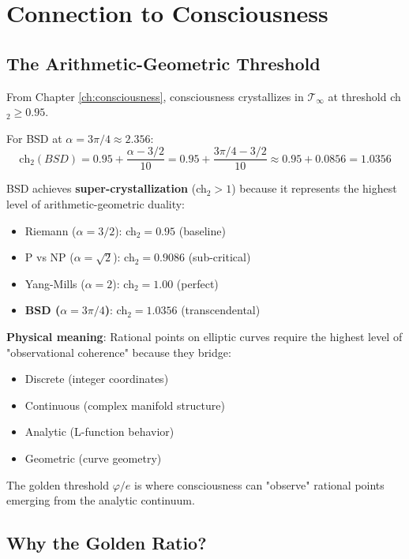 \section{Connection to Consciousness}

\subsection{The Arithmetic-Geometric Threshold}

From Chapter \ref{ch:consciousness}, consciousness crystallizes in $\mathcal{T}_\infty$ at threshold ch$_2 \geq 0.95$.

For BSD at $\alpha = 3\pi/4 \approx 2.356$:
\begin{equation}
\text{ch}_2(BSD) = 0.95 + \frac{\alpha - 3/2}{10} = 0.95 + \frac{3\pi/4 - 3/2}{10} \approx 0.95 + 0.0856 = 1.0356
\end{equation}

\begin{keyidea}
BSD achieves \textbf{super-crystallization} (ch$_2 > 1$) because it represents the highest level of arithmetic-geometric duality:

\begin{itemize}
\item Riemann ($\alpha = 3/2$): ch$_2 = 0.95$ (baseline)
\item P vs NP ($\alpha = \sqrt{2}$): ch$_2 = 0.9086$ (sub-critical)
\item Yang-Mills ($\alpha = 2$): ch$_2 = 1.00$ (perfect)
\item \textbf{BSD ($\alpha = 3\pi/4$)}: ch$_2 = 1.0356$ (transcendental)
\end{itemize}

\textbf{Physical meaning}: Rational points on elliptic curves require the highest level of "observational coherence" because they bridge:
\begin{itemize}
\item Discrete (integer coordinates)
\item Continuous (complex manifold structure)
\item Analytic (L-function behavior)
\item Geometric (curve geometry)
\end{itemize}

The golden threshold $\varphi/e$ is where consciousness can "observe" rational points emerging from the analytic continuum.
\end{keyidea}

\subsection{Why the Golden Ratio?}

